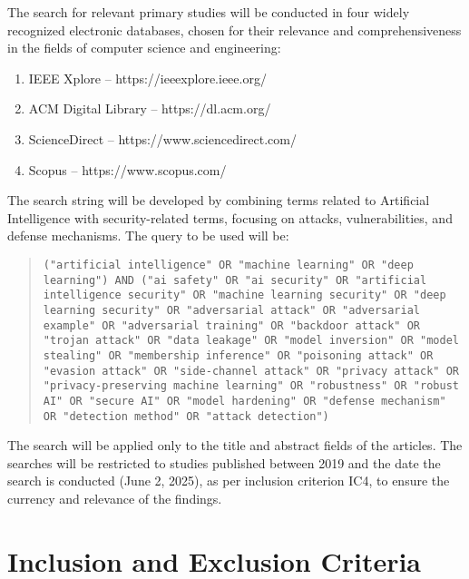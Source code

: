 \documentclass[twoside,brazilian,english]{UNISINOSmonografia}
\begin{document}
The search for relevant primary studies will be conducted in four widely recognized electronic databases, chosen for their relevance and comprehensiveness in the fields of computer science and engineering:
\begin{enumerate}
    \item IEEE Xplore – https://ieeexplore.ieee.org/
    \item ACM Digital Library – https://dl.acm.org/
    \item ScienceDirect – https://www.sciencedirect.com/
    \item Scopus – https://www.scopus.com/
\end{enumerate}

The search string will be developed by combining terms related to Artificial Intelligence with security-related terms, focusing on attacks, vulnerabilities, and defense mechanisms. The query to be used will be:
\begin{quote}
\texttt{("artificial intelligence" OR "machine learning" OR "deep learning") AND ("ai safety" OR "ai security" OR "artificial intelligence security" OR "machine learning security" OR "deep learning security" OR "adversarial attack" OR "adversarial example" OR "adversarial training" OR "backdoor attack" OR "trojan attack" OR "data leakage" OR "model inversion" OR "model stealing" OR "membership inference" OR "poisoning attack" OR "evasion attack" OR "side-channel attack" OR "privacy attack" OR "privacy-preserving machine learning" OR "robustness" OR "robust AI" OR "secure AI" OR "model hardening" OR "defense mechanism" OR "detection method" OR "attack detection")}
\end{quote}

The search will be applied only to the title and abstract fields of the articles. The searches will be restricted to studies published between 2019 and the date the search is conducted (June 2, 2025), as per inclusion criterion IC4, to ensure the currency and relevance of the findings.

\section{Inclusion and Exclusion Criteria}
\end{document}
